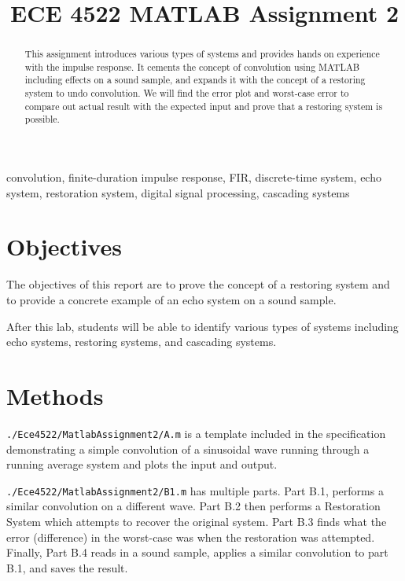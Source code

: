 \documentclass[conference]{../lib/IEEEtran}
\begin{document}
\title{ECE 4522 MATLAB Assignment 2}

\author{
}

\maketitle

\begin{abstract}
This assignment introduces various types of systems and provides hands on experience with the impulse response. It cements the concept of convolution using MATLAB including effects on a sound sample, and expands it with the concept of a restoring system to undo convolution. We will find the error plot and worst-case error to compare out actual result with the expected input and prove that a restoring system is possible.
\end{abstract}

\begin{IEEEkeywords}
convolution, finite-duration impulse response, FIR, discrete-time system, echo system, restoration system, digital signal processing, cascading systems
\end{IEEEkeywords}

\section{Objectives}

The objectives of this report are to prove the concept of a restoring system and to provide a concrete example of an echo system on a sound sample.

After this lab, students will be able to identify various types of systems including echo systems, restoring systems, and cascading systems.

\section{Methods}

\texttt{./Ece4522/MatlabAssignment2/A.m} is a template included in the specification demonstrating a simple convolution of a sinusoidal wave running through a running average system and plots the input and output.

\texttt{./Ece4522/MatlabAssignment2/B1.m} has multiple parts. Part B.1, performs a similar convolution on a different wave. Part B.2 then performs a Restoration System which attempts to recover the original system. Part B.3 finds what the error (difference) in the worst-case was when the restoration was attempted. Finally, Part B.4 reads in a sound sample, applies a similar convolution to part B.1, and saves the result.
\end{document}
